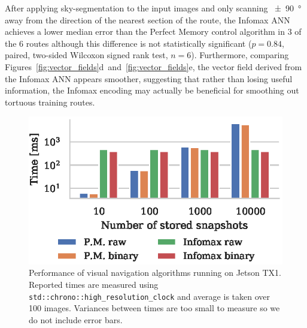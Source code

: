 \documentclass[letterpaper]{article}
\begin{document}
After applying sky-segmentation to the input images and only scanning \SI{\pm 90}{\degree} away from the direction of the nearest section of the route, the Infomax ANN achieves a lower median error than the Perfect Memory control algorithm in 3 of the 6 routes although this difference is not statistically significant ($p=0.84$, paired, two-sided Wilcoxon signed rank test, $n=6$).
Furthermore, comparing Figures~\ref{fig:vector_fields}d~and~\ref{fig:vector_fields}e, the vector field derived from the Infomax ANN appears smoother, suggesting that rather than losing useful information, the Infomax encoding may actually be beneficial for smoothing out tortuous training routes.

\begin{figure}[t]
    \centering
    \includegraphics{figures/jetson_test_performance.eps}
    \caption{Performance of visual navigation algorithms running on Jetson TX1. 
    Reported times are measured using \lstinline{std::chrono::high_resolution_clock} and average is taken over \num{100} images.
    Variances between times are too small to measure so we do not include error bars.}
    \label{fig:jetson_test_performance}
\end{figure}
\end{document}
